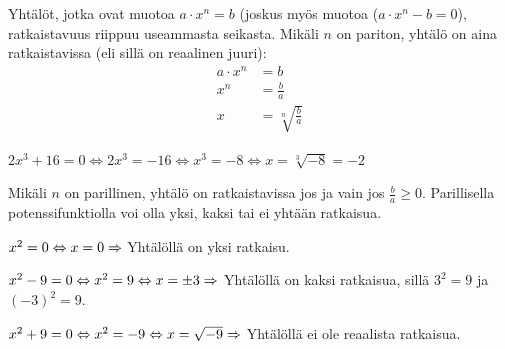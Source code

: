 



Yhtälöt, jotka ovat muotoa $a\cdot x^n = b$ (joskus myös muotoa ($a\cdot x^n - b = 0$), ratkaistavuus riippuu useammasta seikasta. Mikäli $n$ on pariton, yhtälö on aina ratkaistavissa (eli sillä on reaalinen juuri):
\begin{align*}
a\cdot x^n &= b \\
x^n &= \frac{b}{a} \\
x &= \sqrt[n]{\frac{b}{a}}
\end{align*}

\begin{esimerkki}
$2x^3 + 16 = 0 \Leftrightarrow 2x^3 = -16 \Leftrightarrow x^3 = -8  \Leftrightarrow x = \sqrt[3]{-8} = -2 $
\end{esimerkki}

Mikäli $n$ on parillinen, yhtälö on ratkaistavissa jos ja vain jos $\frac{b}{a} \geq 0 $. Parillisella potenssifunktiolla voi olla yksi, kaksi tai ei yhtään ratkaisua.

\begin{esimerkki}
$x^2 = 0 \Leftrightarrow x = 0 \\
\Rightarrow$ Yhtälöllä on yksi ratkaisu.
\end{esimerkki}

\begin{esimerkki}
$x^2 - 9 = 0 \Leftrightarrow x^2 = 9 \Leftrightarrow x = \pm 3 \\
\Rightarrow$ Yhtälöllä on kaksi ratkaisua, sillä $3^2 = 9$ ja $(-3)^2 = 9$.
\end{esimerkki}

\begin{esimerkki}
$x^2 + 9 = 0 \Leftrightarrow x^2 = -9 \Leftrightarrow x = \sqrt{-9} \\
\Rightarrow$ Yhtälöllä ei ole reaalista ratkaisua.
\end{esimerkki}
